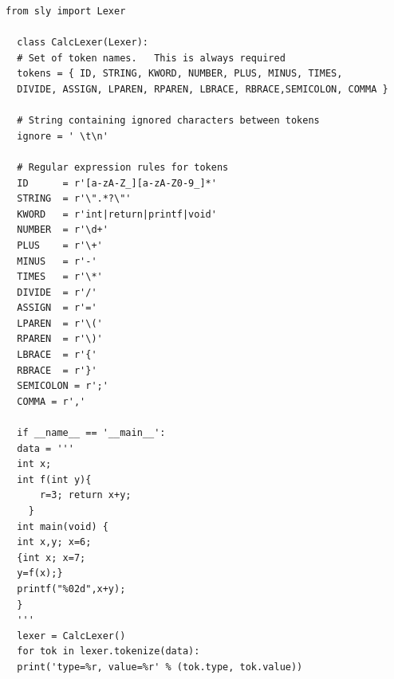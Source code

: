 \documentclass[a4j,dvipdfmx]{jbook}
\begin{document}
\begin{Verbatim}[frame=single]
  from sly import Lexer

  class CalcLexer(Lexer):
  # Set of token names.   This is always required
  tokens = { ID, STRING, KWORD, NUMBER, PLUS, MINUS, TIMES,
  DIVIDE, ASSIGN, LPAREN, RPAREN, LBRACE, RBRACE,SEMICOLON, COMMA }

  # String containing ignored characters between tokens
  ignore = ' \t\n'

  # Regular expression rules for tokens
  ID      = r'[a-zA-Z_][a-zA-Z0-9_]*'
  STRING  = r'\".*?\"'
  KWORD   = r'int|return|printf|void'
  NUMBER  = r'\d+'
  PLUS    = r'\+'
  MINUS   = r'-'
  TIMES   = r'\*'
  DIVIDE  = r'/'
  ASSIGN  = r'='
  LPAREN  = r'\('
  RPAREN  = r'\)'
  LBRACE  = r'{'
  RBRACE  = r'}'
  SEMICOLON = r';'
  COMMA = r','

  if __name__ == '__main__':
  data = '''
  int x;
  int f(int y){
      r=3; return x+y;
    }
  int main(void) {
  int x,y; x=6;
  {int x; x=7;
  y=f(x);}
  printf("%02d",x+y);
  }
  '''
  lexer = CalcLexer()
  for tok in lexer.tokenize(data):
  print('type=%r, value=%r' % (tok.type, tok.value))
\end{Verbatim}
\end{document}
